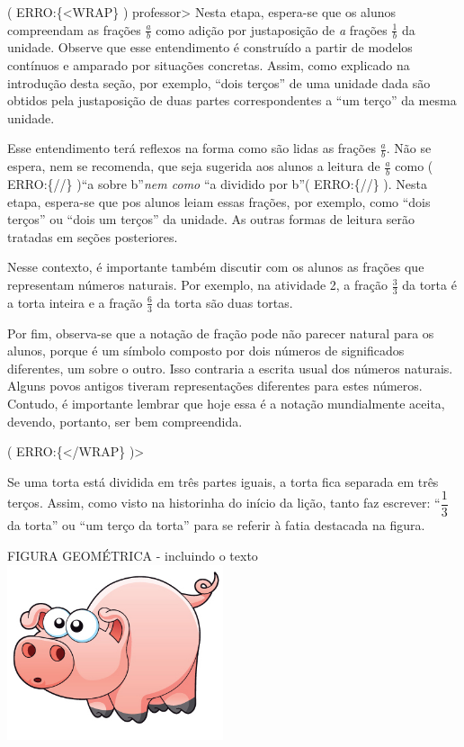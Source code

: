 \documentclass[a4,12pt]{book}
\newcounter{atividade}
\begin{document}
( ERRO:\{<WRAP\} ) professor>
Nesta etapa, espera-se que os alunos compreendam as frações $\frac{a}{b}$ como adição por justaposição de {\it a} frações $\frac{1}{b}$ da unidade. Observe que esse entendimento é construído a partir de modelos contínuos e amparado por situações concretas. Assim, como explicado na introdução desta seção, por exemplo, ``dois terços'' de uma unidade dada são obtidos pela justaposição de duas partes correspondentes a ``um terço'' da mesma unidade. 

Esse entendimento terá reflexos na forma como são lidas as frações $\frac{a}{b}$. Não se espera, nem se recomenda, que seja sugerida aos alunos a leitura de $\frac{a}{b}$ como ( ERRO:\{//\} )``a sobre b''{\it  nem como }``a dividido por b''( ERRO:\{//\} ). Nesta etapa, espera-se que pos alunos leiam essas frações, por exemplo, como ``dois terços'' ou ``dois um terços'' da unidade. As outras formas de leitura serão tratadas em seções posteriores.

Nesse contexto, é importante também discutir com os alunos as frações que representam números naturais. Por exemplo, na atividade 2, a fração $\frac{3}{3}$ da torta é a torta inteira e a fração $\frac{6}{3}$ da torta são duas tortas. 

Por fim, observa-se que a notação de fração pode não parecer natural para os alunos, porque é um símbolo composto por dois números de significados diferentes, um sobre o outro. Isso contraria a escrita usual dos números naturais. Alguns povos antigos tiveram representações diferentes para estes números.  Contudo, é importante lembrar que hoje essa é a notação mundialmente aceita, devendo, portanto, ser bem compreendida. 

( ERRO:\{</WRAP\} )>


Se uma torta está dividida em três partes iguais, a torta fica separada em três terços. Assim, como visto na historinha do início da lição, tanto faz escrever: ``$\dfrac{1}{3}$ da torta'' ou ``um terço da torta'' para se referir à fatia destacada na figura.

\begin{imagem*}[breakable]{}{}   FIGURA GEOMÉTRICA - incluindo o texto  \mbox{} \newline        \includegraphics[width=180pt, keepaspectratio]{pig}\end{imagem*}
\end{document}
